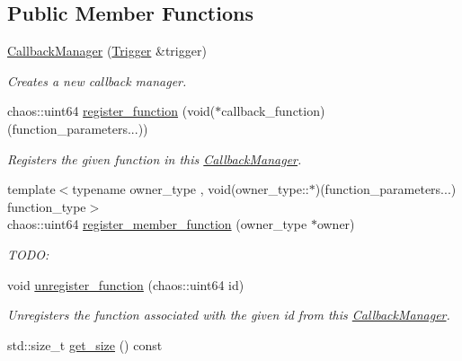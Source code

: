 \subsection*{Public Member Functions}
\begin{DoxyCompactItemize}
\item 
\hypertarget{classsigma_1_1core_1_1_callback_manager_a16daea2887f1654abd7e5d0f0644bb7d}{}\hyperlink{classsigma_1_1core_1_1_callback_manager_a16daea2887f1654abd7e5d0f0644bb7d}{Callback\+Manager} (\hyperlink{classsigma_1_1core_1_1_callback_manager_1_1_trigger}{Trigger} \&trigger)\label{classsigma_1_1core_1_1_callback_manager_a16daea2887f1654abd7e5d0f0644bb7d}

\begin{DoxyCompactList}\small\item\em Creates a new callback manager. \end{DoxyCompactList}\item 
chaos\+::uint64 \hyperlink{classsigma_1_1core_1_1_callback_manager_a7dbb06902d49789afc466a3ecbacbfe2}{register\+\_\+function} (void($\ast$callback\+\_\+function)(function\+\_\+parameters...))
\begin{DoxyCompactList}\small\item\em Registers the given function in this \hyperlink{classsigma_1_1core_1_1_callback_manager}{Callback\+Manager}. \end{DoxyCompactList}\item 
\hypertarget{classsigma_1_1core_1_1_callback_manager_a64fc896997b3296fb027bad74831e58c}{}{\footnotesize template$<$typename owner\+\_\+type , void(owner\+\_\+type\+::$\ast$)(function\+\_\+parameters...) function\+\_\+type$>$ }\\chaos\+::uint64 \hyperlink{classsigma_1_1core_1_1_callback_manager_a64fc896997b3296fb027bad74831e58c}{register\+\_\+member\+\_\+function} (owner\+\_\+type $\ast$owner)\label{classsigma_1_1core_1_1_callback_manager_a64fc896997b3296fb027bad74831e58c}

\begin{DoxyCompactList}\small\item\em T\+O\+D\+O\+: \end{DoxyCompactList}\item 
void \hyperlink{classsigma_1_1core_1_1_callback_manager_a1a03ab9185e131aa077c6528e6d2dcd8}{unregister\+\_\+function} (chaos\+::uint64 id)
\begin{DoxyCompactList}\small\item\em Unregisters the function associated with the given id from this \hyperlink{classsigma_1_1core_1_1_callback_manager}{Callback\+Manager}. \end{DoxyCompactList}\item 
\hypertarget{classsigma_1_1core_1_1_callback_manager_aff8fd473b7492eeb9f77ee07c47e163a}{}std\+::size\+\_\+t \hyperlink{classsigma_1_1core_1_1_callback_manager_aff8fd473b7492eeb9f77ee07c47e163a}{get\+\_\+size} () const \label{classsigma_1_1core_1_1_callback_manager_aff8fd473b7492eeb9f77ee07c47e163a}


\end{DoxyCompactItemize}
